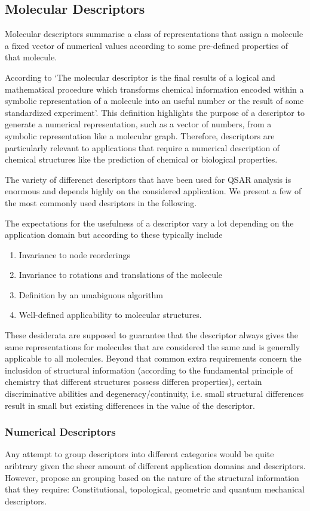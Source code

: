 \subsection{Molecular Descriptors}
Molecular descriptors summarise a class of representations that assign a molecule a fixed vector of numerical values according to some pre-defined properties of that molecule. 

According to \cite{todeschini2008handbook} `The molecular descriptor is the final results of a logical and mathematical procedure which transforms chemical information encoded within a symbolic representation of a molecule into an useful number or the result of some standardized experiment'. This definition highlights the purpose of a descriptor to generate a numerical representation, such as a vector of numbers, from a symbolic representation like a molecular graph. Therefore, descriptors are particularly relevant to applications that require a numerical description of chemical structures like the prediction of chemical or biological properties.  

The variety of differenct descriptors that have been used for QSAR analysis is enormous and depends highly on the considered application. We present a few of the most commonly used desriptors in the following. 

The expectations for the usefulness of a descriptor vary a lot depending on the application domain but according to \cite{Mauri2016} these typically include
\begin{enumerate}
	\item Invariance to node reorderings
	\item Invariance to rotations and translations of the molecule
	\item Definition by an umabiguous algorithm
	\item Well-defined applicability to molecular structures.
\end{enumerate}
These desiderata are supposed to guarantee that the descriptor always gives the same representations for molecules that are considered the same and is generally applicable to all molecules. Beyond that common extra requirements concern the inclusidon of structural information (according to the fundamental principle of chemistry that different structures possess differen properties), certain discriminative abilities and degeneracy/continuity, i.e. small structural differences result in small but existing differences in the value of the descriptor. 

\subsubsection{Numerical Descriptors}
Any attempt to group descriptors into different categories would be quite aribtrary given the sheer amount of different application domains and descriptors. However, \cite{descript} propose an grouping based on the nature of the structural information that they require: Constitutional, topological, geometric and quantum mechanical descriptors. 

